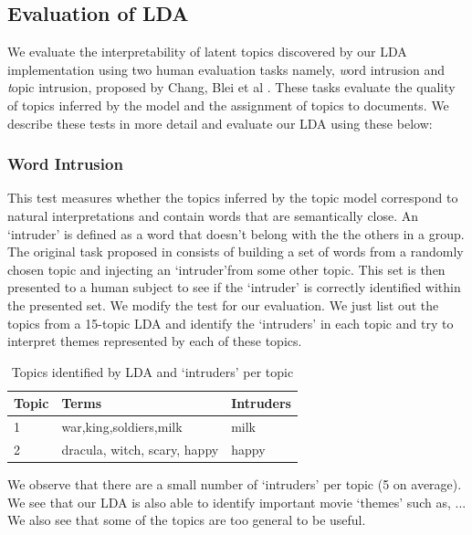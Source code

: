 \documentclass{article} %
\begin{document}
\subsection{Evaluation of LDA}

We evaluate the interpretability of latent topics discovered by our LDA
implementation using two human evaluation tasks namely, {\textit word intrusion}
and {\textit topic intrusion}, proposed by Chang, Blei et al \cite{tea-leaves}. 
These tasks evaluate the quality of topics inferred by the model and the 
assignment of topics to documents. We describe these tests in more detail and
evaluate our LDA using these below:

\subsubsection{Word Intrusion}
This test measures whether the topics inferred by the topic model correspond
to natural interpretations and contain words that are semantically close. An
`intruder' is defined as a word that doesn't belong with the the others in a 
group. The original task proposed in \cite{tea-leaves} consists of 
building a set of words from a randomly chosen topic and injecting an `intruder'from some other topic. This set is then presented to a human subject to see if 
the `intruder' is correctly identified within the presented set. We modify the 
test for our evaluation. We just list out the topics from a 15-topic 
LDA and identify the `intruders' in each topic and try to interpret themes
represented by each of these topics.

\begin{table}[h]
\label{table:word-intrusion}
\begin{center}
\begin{tabular}{lll}
Topic	& Terms	& Intruders \\ \hline
1 & war,king,soldiers,milk & milk \\
2 & dracula, witch, scary, happy & happy \\
\end{tabular}
\end{center}
\caption{Topics identified by LDA and `intruders' per topic}
\end{table}

We observe that there are a small number of `intruders' per topic (5 on 
average). We see that our LDA is also able to identify important movie `themes'
 such as, ... We also see that some of the topics are too general to be useful.
\end{document}
